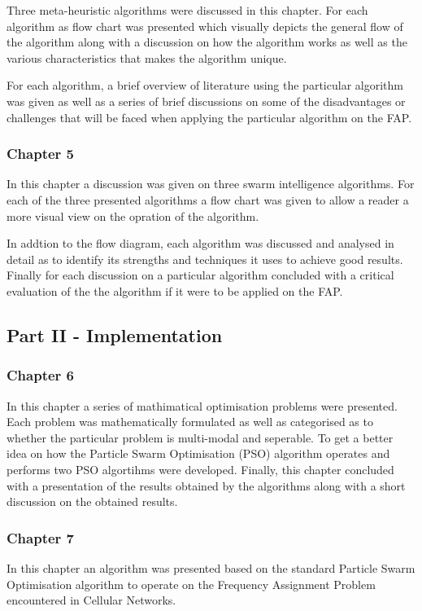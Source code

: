 Three meta-heuristic algorithms were discussed in this chapter. For each algorithm as flow chart was presented which visually depicts the general flow of the algorithm along with a discussion on how the algorithm works as well as the various characteristics that makes the algorithm unique.

For each algorithm, a brief overview of literature using the particular algorithm was given as well as a series of brief discussions on some of the disadvantages or challenges that will be faced when applying the particular algorithm on the FAP.

\subsubsection{Chapter 5}
In this chapter a discussion was given on three swarm intelligence algorithms. For each of the three presented algorithms a flow chart was given to allow a reader a more visual view on the opration of the algorithm. 

In addtion to the flow diagram, each algorithm was discussed and analysed in detail as to identify its strengths and techniques it uses to achieve good results. Finally for each discussion on a particular algorithm concluded with a critical evaluation of the the algorithm if it were to be applied on the FAP.
\subsection{Part II - Implementation}
\subsubsection{Chapter 6}
In this chapter a series of mathimatical optimisation problems were presented. Each problem was mathematically formulated as well as categorised as to whether the particular problem is multi-modal and seperable.
To get a better idea on how the Particle Swarm Optimisation (PSO) algorithm operates and performs two PSO algortihms were developed. Finally, this chapter concluded with a presentation of the results obtained by the algorithms along with a short discussion on the obtained results.
\subsubsection{Chapter 7}
In this chapter an algorithm was presented based on the standard Particle Swarm Optimisation algorithm to operate on the Frequency Assignment Problem encountered in Cellular Networks.

